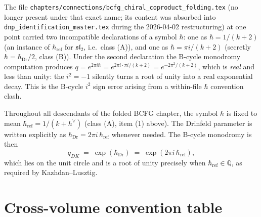 The file
\texttt{chapters/connections/bcfg\_chiral\_coproduct\_folding.tex} (no longer
present under that exact name; its content was absorbed into
\texttt{dnp\_identification\_master.tex} during the 2026-04-02 restructuring)
at one point carried two incompatible declarations of a symbol $\hbar$: one as
$\hbar = 1/(k+2)$ (an instance of $\hbar_{\mathrm{ref}}$ for $\mathfrak{sl}_{2}$,
i.e.\ class (A)), and one as $\hbar = \pi i/(k+2)$ (secretly
$\hbar = \hbar_{\mathrm{Dr}}/2$, class (B)). Under the second declaration the
B-cycle monodromy computation produces
$q = e^{2\pi i\hbar} = e^{2\pi i\cdot\pi i/(k+2)} = e^{-2\pi^{2}/(k+2)}$, which
is \emph{real} and less than unity: the $i^{2}=-1$ silently turns a root of
unity into a real exponential decay. This is the B-cycle $i^{2}$ sign error
arising from a within-file $\hbar$ convention clash.

\begin{resolution}
Throughout all descendants of the folded BCFG chapter, the symbol $\hbar$ is
fixed to mean $\hbar_{\mathrm{ref}} = 1/(k+h^\vee)$ (class (A), item (1)
above). The Drinfeld parameter is written explicitly as
$\hbar_{\mathrm{Dr}} = 2\pi i\,\hbar_{\mathrm{ref}}$ whenever needed. The
B-cycle monodromy is then
\[
 q_{DK} \;=\; \exp(\hbar_{\mathrm{Dr}}) \;=\; \exp(2\pi i\,\hbar_{\mathrm{ref}}),
\]
which lies on the unit circle and is a root of unity precisely when
$\hbar_{\mathrm{ref}}\in\mathbb{Q}$, as required by Kazhdan--Lusztig.
\end{resolution}

\section{Cross-volume convention table}
\label{sec:cross-vol-conventions}

